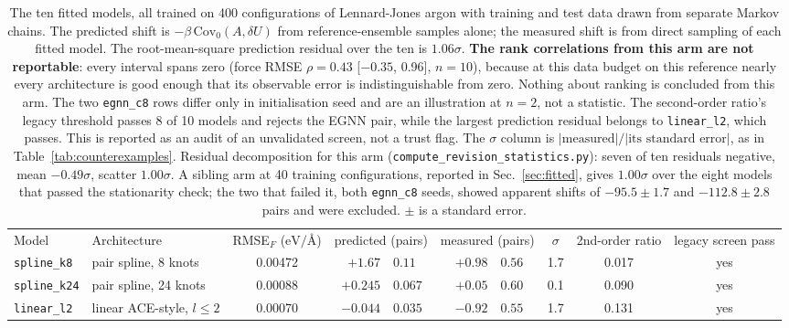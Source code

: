 \documentclass[aip,jcp,reprint,amsmath,amssymb,floatfix]{revtex4-2}
\newcommand{\dU}{\ensuremath{\delta U}}
\newcommand{\Cov}{\ensuremath{\mathrm{Cov}}}
\newcommand{\eVA}{\ensuremath{\mathrm{eV}/\text{\AA}}}
\begin{document}
\begin{table}[t]
\caption{\label{tab:zoo}%
The ten fitted models, all trained on 400 configurations of Lennard-Jones argon
with training and test data drawn from separate Markov chains. The predicted
shift is $-\beta\,\Cov_0(A,\dU)$ from reference-ensemble samples alone; the
measured shift is from direct sampling of each fitted model. The
root-mean-square prediction residual over the ten is $1.06\sigma$. \textbf{The
rank correlations from this arm are not reportable}: every interval spans zero
(force RMSE $\rho = 0.43$ [$-0.35$, 0.96], $n = 10$), because at this data
budget on this reference nearly every architecture is good enough that its
observable error is indistinguishable from zero. Nothing about ranking is
concluded from this arm. The two \texttt{egnn\_c8} rows differ only in
initialisation seed and are an illustration at \textbf{$n = 2$}, not a
statistic. The second-order ratio's legacy threshold passes 8 of 10 models and
rejects the EGNN pair, while the largest prediction residual belongs to
\texttt{linear\_l2}, which passes. This is reported as an audit of an
unvalidated screen, not a trust flag. The
$\sigma$ column is $|\text{measured}|/|\text{its standard error}|$, as in
Table~\ref{tab:counterexamples}. Residual decomposition for this arm
(\texttt{compute\_revision\_statistics.py}): seven of ten residuals negative,
mean $-0.49\sigma$, scatter $1.00\sigma$. A sibling arm at 40 training
configurations, reported in Sec.~\ref{sec:fitted}, gives $1.00\sigma$ over the
eight models that passed the stationarity check; the two that failed it, both
\texttt{egnn\_c8} seeds, showed apparent shifts of $-95.5 \pm 1.7$ and
$-112.8 \pm 2.8$ pairs and were excluded. $\pm$ is a standard error.}
\begin{ruledtabular}
\begin{tabular}{llcr@{\,$\pm$\,}lr@{\,$\pm$\,}lccc}
Model & Architecture & RMSE$_F$ ($\eVA$) &
\multicolumn{2}{c}{predicted (pairs)} & \multicolumn{2}{c}{measured (pairs)} &
$\sigma$ & 2nd-order ratio & legacy screen pass \\
\colrule
\texttt{spline\_k8}    & pair spline, 8 knots   & 0.00472 & $+1.67$ & $0.11$ & $+0.98$ & $0.56$ & 1.7 & 0.017 & yes \\
\texttt{spline\_k24}   & pair spline, 24 knots  & 0.00088 & $+0.245$ & $0.067$ & $+0.05$ & $0.60$ & 0.1 & 0.090 & yes \\
\texttt{linear\_l2}    & linear ACE-style, $l\le2$ & 0.00070 & $-0.044$ & $0.035$ & $-0.92$ & $0.55$ & 1.7 & 0.131 & yes\footnotemark[1] \\

\end{tabular}
\end{ruledtabular}
\end{table}
\end{document}
